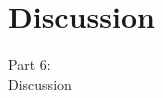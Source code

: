 \section{Discussion}
\begin{frame}
  \vspace{25mm}
  \begin{center}
    \Huge{Part 6:\\Discussion}
  \end{center}
\end{frame}
